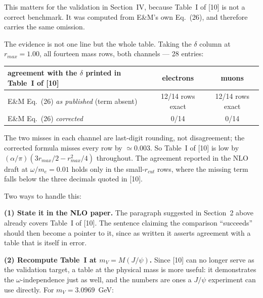\documentclass[11pt]{article}
\begin{document}
This matters for the validation in Section~IV, because Table~I of [10] is not a
correct benchmark. It was computed from E\&M's own Eq.~(26), and therefore
carries the same omission.

The evidence is not one line but the whole table. Taking the $\delta$ column at
$r_{max}=1.00$, all fourteen mass rows, both channels --- 28 entries:

\begin{center}
\begin{tabular}{lcc}
\toprule
agreement with the $\delta$ printed in Table~I of [10] & electrons & muons\\
\midrule
E\&M Eq.~(26) \emph{as published} (term absent) & 12/14 rows exact & 12/14 rows exact\\
E\&M Eq.~(26) \emph{corrected}                  & 0/14             & 0/14\\
\bottomrule
\end{tabular}
\end{center}

The two misses in each channel are last-digit rounding, not disagreement; the
corrected formula misses every row by $\simeq0.003$. So Table~I of [10] is low by
$(\alpha/\pi)(3r_{max}/2-r_{max}^{2}/4)$ throughout. The agreement reported in
the NLO draft at $\omega/m_e=0.01$ holds only in the small-$r_{cut}$ rows, where
the missing term falls below the three decimals quoted in [10].

Two ways to handle this:

\textbf{(1) State it in the NLO paper.} The paragraph suggested in Section~2
above already covers Table~I of [10]. The sentence claiming the comparison
``succeeds'' should then become a pointer to it, since as written it asserts
agreement with a table that is itself in error.

\textbf{(2) Recompute Table~I at $m_V=M(J/\psi)$.} Since [10] can no longer serve
as the validation target, a table at the physical mass is more useful: it
demonstrates the $\omega$-independence just as well, and the numbers are ones a
$J/\psi$ experiment can use directly. For $m_V=3.0969$~GeV:
\end{document}

